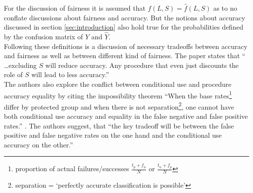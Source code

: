 
For the discussion of fairness it is assumed that $f(L,S) = \hat{f}(L,S)$ as to no 
conflate discussions about fairness and accuracy. But the notions about accuracy discussed 
in section \ref{sec:introduction} also hold true for the probabilities defined by the 
confusion matrix of $Y$ and $\hat{Y}$. \\

Following these definitions is a discussion of necessary tradeoffs between accuracy and 
fairness as well as between different kind of fairness. The paper states that \enquote{
\dots excluding $S$ will reduce accuracy. Any procedure that even just discounts the role 
of $S$ will lead to less accuracy.}\cite{Berk.2018} \\
The authors also explore the conflict between conditional use and procedure accuracy equality
by citing the impossibility theorem \enquote{When the base rates\footnote{proportion of actual failures/successes 
$\frac{t_p + f_n}{N}$ or $\frac{t_n + f_p}{N}$} differ by protected group and when there 
is not separation\footnote{separation = \enquote{perfectly accurate classification is 
possible}\cite{Berk.2018}}, one cannot have both conditional use accuracy and equality in 
the false negative and false positive rates.}\cite{DBLP:journals/corr/KleinbergMR16}
\cite{Chouldechova2017FairPW}. The authors suggest, that \enquote{the key tradeoff will be between
the false positive and false negative rates on the one hand and the conditional use accuracy
on the other.}\cite{Berk.2018}\\

